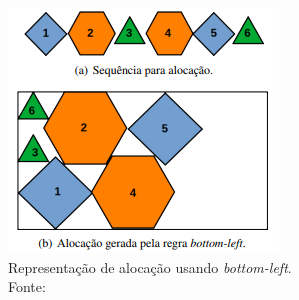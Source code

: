 \begin{figure}[!htb]
    \centering
    \includegraphics{utils/images/bottom-left}
    \caption{Representação de alocação usando \textit{bottom-left}. \\
    Fonte: \cite{aprendizado-reforco}}
    \label{fig:bottom-left}
\end{figure}
